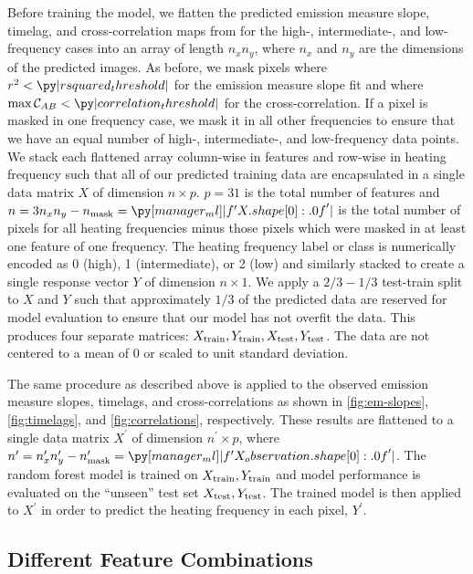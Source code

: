 Before training the model, we flatten the predicted emission measure slope, timelag, and cross-correlation maps from  for the high-, intermediate-, and low-frequency cases into an array of length $n_xn_y$, where $n_x$ and $n_y$ are the dimensions of the predicted images. As before, we mask pixels where $r^2<\py|rsquared_threshold|$ for the emission measure slope fit and where $\max\mathcal{C}_{AB}<\py|correlation_threshold|$ for the cross-correlation. If a pixel is masked in one frequency case, we mask it in all other frequencies to ensure that we have an equal number of high-, intermediate-, and low-frequency data points. We stack each flattened array column-wise in features and row-wise in heating frequency such that all of our predicted training data are encapsulated in a single data matrix $X$ of dimension $n\times p$. $p=31$ is the total number of features and $n=3n_xn_y - n_\textup{mask}=\py[manager_ml]|f'{X.shape[0]:.0f}'|$ is the total number of pixels for all heating frequencies minus those pixels which were masked in at least one feature of one frequency. The heating frequency label or class is numerically encoded as 0 (high), 1 (intermediate), or 2 (low) and similarly stacked to create a single response vector $Y$ of dimension $n\times1$. We apply a $2/3-1/3$ test-train split to $X$ and $Y$ such that approximately $1/3$ of the predicted data are reserved for model evaluation to ensure that our model has not overfit the data. This produces four separate matrices: $X_\textup{train},Y_\textup{train},X_\textup{test},Y_\textup{test}$. The data are not centered to a mean of 0 or scaled to unit standard deviation.

The same procedure as described above is applied to the observed emission measure slopes, timelags, and cross-correlations as shown in \autoref{fig:em-slopes}, \autoref{fig:timelags}, and \autoref{fig:correlations}, respectively. These results are flattened to a single data matrix $X^\prime$ of dimension $n^\prime\times p$, where $n^\prime=n_x^\prime n_y^\prime - n^\prime_\textup{mask}=\py[manager_ml]|f'{X_observation.shape[0]:.0f}'|$. The random forest model is trained on $X_\textup{train},Y_\textup{train}$ and model performance is evaluated on the ``unseen'' test set $X_\textup{test},Y_\textup{test}$. The trained model is then applied to $X^\prime$ in order to predict the heating frequency in each pixel, $Y^\prime$.

\subsection{Different Feature Combinations}\label{sec:feature-combos}

